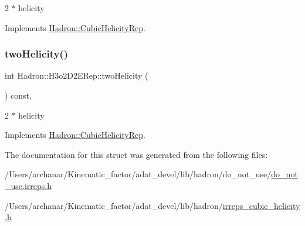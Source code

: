 2 $\ast$ helicity 

Implements \mbox{\hyperlink{structHadron_1_1CubicHelicityRep_af507aa56fc2747eacc8cb6c96db31ecc}{Hadron\+::\+Cubic\+Helicity\+Rep}}.

\mbox{\label{structHadron_1_1H3o2D2ERep_a834909b5a05a1e80078eec2e2349831b}} 
\subsubsection{\texorpdfstring{twoHelicity()}{twoHelicity()}\hspace{0.1cm}{\footnotesize\ttfamily [2/2]}}
{\footnotesize\ttfamily int Hadron\+::\+H3o2\+D2\+E\+Rep\+::two\+Helicity (\begin{DoxyParamCaption}{ }\end{DoxyParamCaption}) const\hspace{0.3cm}{\ttfamily [inline]}, {\ttfamily [virtual]}}

2 $\ast$ helicity 

Implements \mbox{\hyperlink{structHadron_1_1CubicHelicityRep_af507aa56fc2747eacc8cb6c96db31ecc}{Hadron\+::\+Cubic\+Helicity\+Rep}}.



The documentation for this struct was generated from the following files\+:\begin{DoxyCompactItemize}
\item 
/\+Users/archanar/\+Kinematic\+\_\+factor/adat\+\_\+devel/lib/hadron/do\+\_\+not\+\_\+use/\mbox{\hyperlink{do__not__use_8irreps_8h}{do\+\_\+not\+\_\+use.\+irreps.\+h}}\item 
/\+Users/archanar/\+Kinematic\+\_\+factor/adat\+\_\+devel/lib/hadron/\mbox{\hyperlink{lib_2hadron_2irreps__cubic__helicity_8h}{irreps\+\_\+cubic\+\_\+helicity.\+h}}\end{DoxyCompactItemize}
